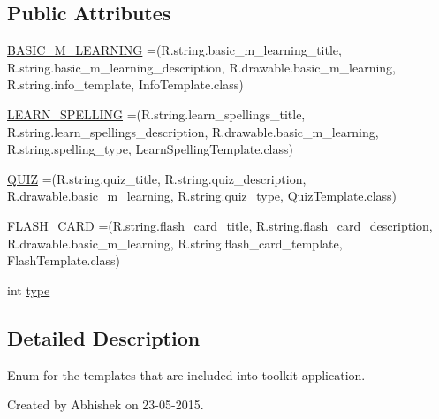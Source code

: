 \subsection*{Public Attributes}
\begin{DoxyCompactItemize}
\item 
\hyperlink{enumorg_1_1buildmlearn_1_1toolkit_1_1model_1_1Template_a677ac7115aa6a442f35bdc7e2f44868f}{B\-A\-S\-I\-C\-\_\-\-M\-\_\-\-L\-E\-A\-R\-N\-I\-N\-G} =(R.\-string.\-basic\-\_\-m\-\_\-learning\-\_\-title, R.\-string.\-basic\-\_\-m\-\_\-learning\-\_\-description, R.\-drawable.\-basic\-\_\-m\-\_\-learning, R.\-string.\-info\-\_\-template, Info\-Template.\-class)
\item 
\hyperlink{enumorg_1_1buildmlearn_1_1toolkit_1_1model_1_1Template_ac92d5f18de318d36ba42ae0aba85576d}{L\-E\-A\-R\-N\-\_\-\-S\-P\-E\-L\-L\-I\-N\-G} =(R.\-string.\-learn\-\_\-spellings\-\_\-title, R.\-string.\-learn\-\_\-spellings\-\_\-description, R.\-drawable.\-basic\-\_\-m\-\_\-learning, R.\-string.\-spelling\-\_\-type, Learn\-Spelling\-Template.\-class)
\item 
\hyperlink{enumorg_1_1buildmlearn_1_1toolkit_1_1model_1_1Template_aee37e120e37544ed8fff5341f9012fee}{Q\-U\-I\-Z} =(R.\-string.\-quiz\-\_\-title, R.\-string.\-quiz\-\_\-description, R.\-drawable.\-basic\-\_\-m\-\_\-learning, R.\-string.\-quiz\-\_\-type, Quiz\-Template.\-class)
\item 
\hyperlink{enumorg_1_1buildmlearn_1_1toolkit_1_1model_1_1Template_a320459af7080ce10a9bbca2f60224865}{F\-L\-A\-S\-H\-\_\-\-C\-A\-R\-D} =(R.\-string.\-flash\-\_\-card\-\_\-title, R.\-string.\-flash\-\_\-card\-\_\-description, R.\-drawable.\-basic\-\_\-m\-\_\-learning, R.\-string.\-flash\-\_\-card\-\_\-template, Flash\-Template.\-class)
\item 
int \hyperlink{enumorg_1_1buildmlearn_1_1toolkit_1_1model_1_1Template_a92b84675089efb1f591b3342793df5c4}{type}
\end{DoxyCompactItemize}


\subsection{Detailed Description}
Enum for the templates that are included into toolkit application. 

Created by Abhishek on 23-\/05-\/2015. 

